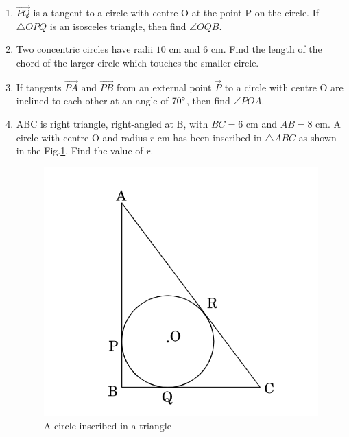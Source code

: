 \documentclass{article}
\begin{document}
\begin{enumerate}

	
\item $\vec{PQ}$ is a tangent to a circle with centre O at the point P on the circle. If $\triangle OPQ$ is an isosceles triangle, then find $\angle OQB$. 

\item Two concentric circles have radii $10$ cm and $6$ cm. Find the length of the chord of the larger circle which touches the smaller circle. 

\item If tangents $\vec{PA}$ and $\vec{PB}$ from an external point $\vec{P}$ to a circle with centre O are inclined to each other at an angle of $70\degree$, then find $\angle POA$. 

\item ABC is right triangle, right-angled at B, with $BC = 6$ cm and $AB = 8$ cm. A circle with centre O and radius $r$ cm has been inscribed in $\triangle ABC$ as shown in the Fig.\ref{fig:4}. Find the value of $r$. 
	\begin{figure}[h]
	\centering
	\includegraphics[width=\columnwidth]{figs/3.jpg}
	\caption{A circle inscribed in a triangle}
	\label{fig:4}
	\end{figure}
	

\end{enumerate}
\end{document}
